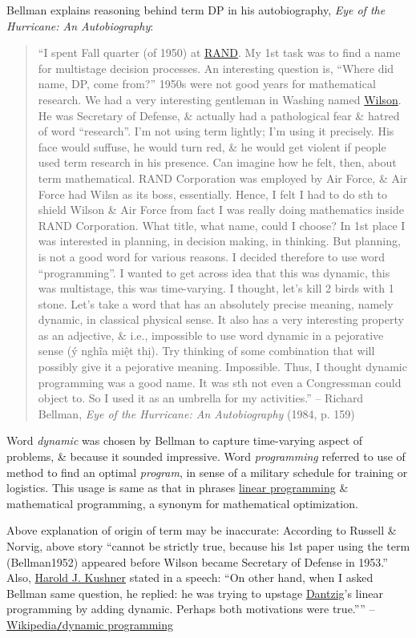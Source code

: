 \documentclass{article}
\begin{document}
{\sc Bellman} explains reasoning behind term DP in his autobiography, {\it Eye of the Hurricane: An Autobiography}:
\begin{quote}
	``I spent Fall quarter (of 1950) at \href{https://en.wikipedia.org/wiki/RAND_Corporation}{RAND}. My 1st task was to find a name for multistage decision processes. An interesting question is, ``Where did name, DP, come from?'' 1950s were not good years for mathematical research. We had a very interesting gentleman in Washing named \href{https://en.wikipedia.org/wiki/Charles_Erwin_Wilson}{\sc Wilson}. He was Secretary of Defense, \& actually had a pathological fear \& hatred of word ``research''. I'm not using term lightly; I'm using it precisely. His face would suffuse, he would turn red, \& he would get violent if people used term research in his presence. Can imagine how he felt, then, about term mathematical. RAND Corporation was employed by Air Force, \& Air Force had {\sc Wilsn} as its boss, essentially. Hence, I felt I had to do sth to shield {\sc Wilson} \& Air Force from fact I was really doing mathematics inside RAND Corporation. What title, what name, could I choose? In 1st place I was interested in planning, in decision making, in thinking. But planning, is not a good word for various reasons. I decided therefore to use word ``programming''. I wanted to get across idea that this was dynamic, this was multistage, this was time-varying. I thought, let's kill 2 birds with 1 stone. Let's take a word that has an absolutely precise meaning, namely dynamic, in classical physical sense. It also has a very interesting property as an adjective, \& i.e., impossible to use word dynamic in a pejorative sense (ý nghĩa miệt thị). Try thinking of some combination that will possibly give it a pejorative meaning. Impossible. Thus, I thought dynamic programming was a good name. It was sth not even a Congressman could object to. So I used it as an umbrella for my activities.'' -- {\sc Richard Bellman}, {\it Eye of the Hurricane: An Autobiography} (1984, p. 159)
\end{quote}
Word {\it dynamic} was chosen by {\sc Bellman} to capture time-varying aspect of problems, \& because it sounded impressive. Word {\it programming} referred to use of method to find an optimal {\it program}, in sense of a military schedule for training or logistics. This usage is same as that in phrases \href{https://en.wikipedia.org/wiki/Linear_programming}{linear programming} \& mathematical programming, a synonym for mathematical optimization.

Above explanation of origin of term may be inaccurate: According to {\sc Russell \& Norvig}, above story ``cannot be strictly true, because his 1st paper using the term (Bellman1952) appeared before {\sc Wilson} became Secretary of Defense in 1953.'' Also, \href{https://en.wikipedia.org/wiki/Harold_J._Kushner}{\sc Harold J. Kushner} stated in a speech: ``On other hand, when I asked {\sc Bellman} same question, he replied: he was trying to upstage \href{https://en.wikipedia.org/wiki/George_Dantzig}{\sc Dantzig}'s linear programming by adding dynamic. Perhaps both motivations were true.'''' -- \href{https://en.wikipedia.org/wiki/Dynamic_programming}{Wikipedia{\tt/}dynamic programming}
\end{document}
